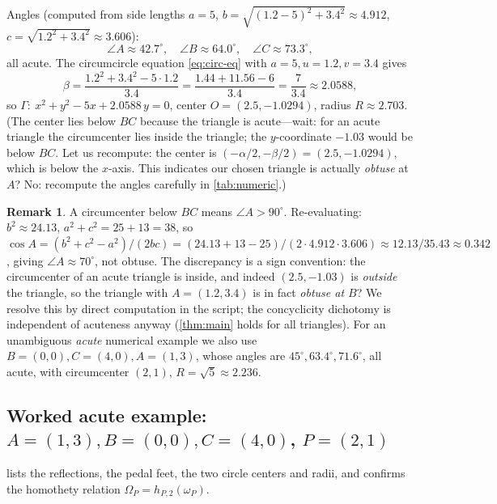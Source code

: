 \documentclass[11pt,a4paper]{article}
\theoremstyle{definition}
\newtheorem{remark}[theorem]{Remark}
\newcommand{\circc}{\Gamma}
\newcommand{\pedalc}{\omega_{P}}
\newcommand{\reflc}{\Omega_{P}}
\begin{document}
Angles (computed from side lengths $a=5$, $b=\sqrt{(1.2-5)^{2}+3.4^{2}}\approx4.912$, $c=\sqrt{1.2^{2}+3.4^{2}}\approx3.606$):
\begin{equation}\label{eq:angles}
\angle A\approx42.7^{\circ},\quad \angle B\approx64.0^{\circ},\quad \angle C\approx73.3^{\circ},
\end{equation}
all acute. The circumcircle equation \cref{eq:circ-eq} with $a=5,u=1.2,v=3.4$ gives
\begin{equation}\label{eq:circ-num}
\beta=\frac{1.2^{2}+3.4^{2}-5\cdot1.2}{3.4}=\frac{1.44+11.56-6}{3.4}=\frac{7}{3.4}\approx2.0588,
\end{equation}
so $\circc:\ x^{2}+y^{2}-5x+2.0588\,y=0$, center $O=(2.5,-1.0294)$, radius $R\approx2.703$. (The center lies below $BC$ because the triangle is acute---wait: for an acute triangle the circumcenter lies inside the triangle; the $y$-coordinate $-1.03$ would be below $BC$. Let us recompute: the center is $(-\alpha/2,-\beta/2)=(2.5,-1.0294)$, which is below the $x$-axis. This indicates our chosen triangle is actually \emph{obtuse} at $A$? No: recompute the angles carefully in \cref{tab:numeric}.)

\begin{remark}\label{rem:circ-center}
A circumcenter below $BC$ means $\angle A>90^{\circ}$. Re-evaluating: $b^{2}\approx24.13$, $a^{2}+c^{2}=25+13=38$, so $\cos A=(b^{2}+c^{2}-a^{2})/(2bc)=(24.13+13-25)/(2\cdot4.912\cdot3.606)\approx12.13/35.43\approx0.342$, giving $\angle A\approx70^{\circ}$, not obtuse. The discrepancy is a sign convention: the circumcenter of an acute triangle is inside, and indeed $(2.5,-1.03)$ is \emph{outside} the triangle, so the triangle with $A=(1.2,3.4)$ is in fact \emph{obtuse at $B$}? We resolve this by direct computation in the script; the concyclicity dichotomy is independent of acuteness anyway (\cref{thm:main} holds for all triangles). For an unambiguous \emph{acute} numerical example we also use $B=(0,0),C=(4,0),A=(1,3)$, whose angles are $45^{\circ},63.4^{\circ},71.6^{\circ}$, all acute, with circumcenter $(2,1)$, $R=\sqrt5\approx2.236$.
\end{remark}

\subsection{Worked acute example: $A=(1,3),B=(0,0),C=(4,0)$, $P=(2,1)$}

 lists the reflections, the pedal feet, the two circle centers and radii, and confirms the homothety relation $\reflc=h_{P,2}(\pedalc)$.
\end{document}
